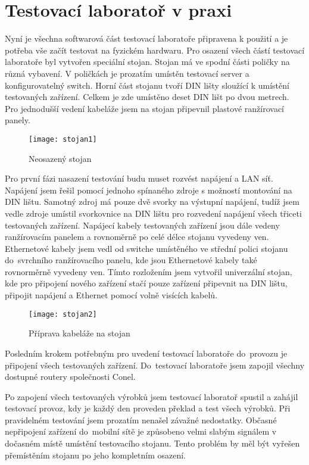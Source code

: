 \chapter{Testovací laboratoř v praxi}

Nyní je všechna softwarová část testovací laboratoře připravena k použití a je potřeba vše začít testovat na fyzickém hardwaru. Pro osazení všech částí testovací laboratoře byl vytvořen speciální stojan. Stojan má ve spodní části poličky na různá vybavení. V poličkách je prozatím umístěn testovací server a konfigurovatelný switch. Horní část stojanu tvoří DIN lišty sloužící k umístění testovaných zařízení. Celkem je zde umístěno deset DIN lišt po dvou metrech. Pro jednodušší vedení kabeláže jsem na stojan připevnil plastové ranžírovací panely.

\begin{figure}[h]
  \centering
  \texttt{[image: stojan1]}
  \caption{Neosazený stojan}
  \label{fig:stojan1}
\end{figure}

Pro první fázi nasazení testování budu muset rozvést napájení a LAN síť. Napájení jsem řešil pomocí jednoho spínaného zdroje s možností montování na DIN lištu. Samotný zdroj má pouze dvě svorky na výstupní napájení, tudíž jsem vedle zdroje umístil svorkovnice na DIN lištu pro rozvedení napájení všech třiceti testovaných zařízení. Napájecí kabely  testovaných zařízení jsou dále vedeny ranžírovacím panelem a rovnoměrně po celé délce stojanu vyvedeny ven. Ethernetové kabely jsem vedl od switche umístěného ve střední polici stojanu do~svrchního ranžírovacího panelu, kde jsou Ethernetové kabely také rovnorměrně vyvedeny ven. Tímto rozložením jsem vytvořil univerzální stojan, kde pro připojení nového zařízení stačí pouze zařízení připevnit na DIN lištu, připojit napájení a Ethernet pomocí volně visících kabelů.

\begin{figure}[h]
  \centering
  \texttt{[image: stojan2]}
  \caption{Příprava kabeláže na stojan}
  \label{fig:stojan2}
\end{figure}

Posledním krokem potřebným pro uvedení testovací laboratoře do~provozu je připojení všech testovaných zařízení. Do~testovací laboratoře jsem zapojil všechny dostupné routery společnosti Conel.

Po zapojení všech testovaných výrobků jsem testovací laboratoř spustil a zahájil testovací provoz, kdy je každý den proveden překlad a test všech výrobků. Při pravidelném testování jsem prozatím nenašel závažné nedostatky. Občasné nepřipojení zařízení do~mobilní sítě je způsobeno velmi slabým signálem v dočasném místě umístění testovacího stojanu. Tento problém by měl být vyřešen přemístěním stojanu po jeho kompletním osazení.

